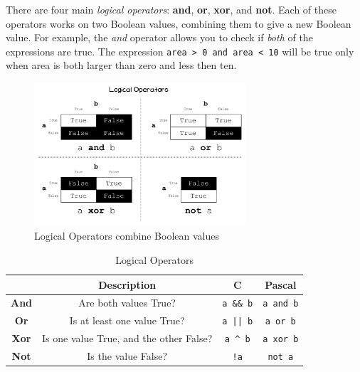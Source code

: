 There are four main \emph{logical operators}: \textbf{and}, \textbf{or}, \textbf{xor}, and \textbf{not}. Each of these operators works on two Boolean values, combining them to give a new Boolean value. For example, the \emph{and} operator allows you to check if \emph{both} of the expressions are true. The expression \texttt{area > 0 and area < 10} will be true only when area is both larger than zero and less then ten.

\begin{figure}[h]
   \centering
   \includegraphics[width=0.7\textwidth]{./topics/control-flow/diagrams/LogicalOperators} 
   \caption{Logical Operators combine Boolean values}
   \label{fig:logical-operators}
\end{figure}

\begin{table}[h]
  \centering
  \begin{tabular}{|c|c|c|c|}
    \hline
     & \textbf{Description} & \textbf{C} & \textbf{Pascal} \\
    \hline
    \textbf{And} & Are both values True? & \texttt{a \&\& b} & \texttt{a and b} \\
    \hline
    \textbf{Or} & Is at least one value True? & \texttt{a || b} & \texttt{a or b} \\
    \hline
    \textbf{Xor} & Is one value True, and the other False? & \texttt{a \^{} b} & \texttt{a xor b} \\
    \hline
    \textbf{Not} & Is the value False? & \texttt{!a} & \texttt{not a}  \\
    \hline
  \end{tabular}
  \caption{Logical Operators}
  \label{tbl:logical-operators}
\end{table}

